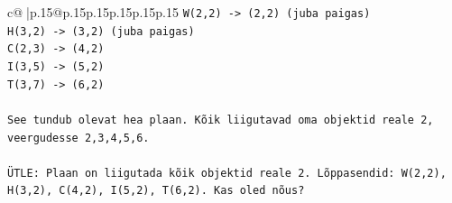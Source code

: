 \documentclass{article}
\begin{document}
{\begin{supertabular}{c@{$\;$}|p{.15\linewidth}@{}p{.15\linewidth}p{.15\linewidth}p{.15\linewidth}p{.15\linewidth}p{.15\linewidth}}
{{{\texttt{W(2,2) {-}> (2,2) (juba paigas)} \\
\texttt{H(3,2) {-}> (3,2) (juba paigas)} \\
\texttt{C(2,3) {-}> (4,2)} \\
\texttt{I(3,5) {-}> (5,2)} \\
\texttt{T(3,7) {-}> (6,2)} \\
\\ 
\texttt{See tundub olevat hea plaan. Kõik liigutavad oma objektid reale 2, veergudesse 2,3,4,5,6.} \\
\\ 
\texttt{ÜTLE: Plaan on liigutada kõik objektid reale 2. Lõppasendid: W(2,2), H(3,2), C(4,2), I(5,2), T(6,2). Kas oled nõus?} \\
            }
        }
    }
     \\ \\


\end{supertabular}}
\end{document}
